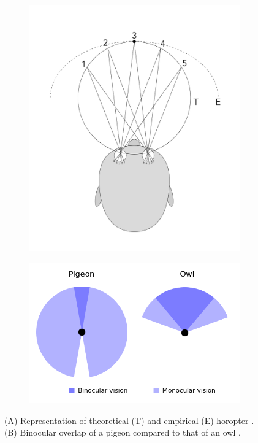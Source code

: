 \begin{figure}[htbp]
    \centering
    \begin{subfigure}[t]{0.3\textwidth}
        \includegraphics[width=\textwidth]{./Template_Figures/horopter}
    	\caption{\label{fig:horoptor}}
    \end{subfigure}
    \begin{subfigure}[t]{0.5\textwidth}
        \includegraphics[width=\textwidth]{./Template_Figures/Fieldofview-pigeon-owl}
        \caption{}\label{fig:bin_overlap}
    \end{subfigure}
    \caption{(A) Representation of theoretical (T) and empirical (E) horopter \cite{ wiki:horoptor}. (B) Binocular overlap of a pigeon compared to that of an owl \cite{ wiki:binocular_vision}.\label{fig:binocular_vision}}
\end{figure}

